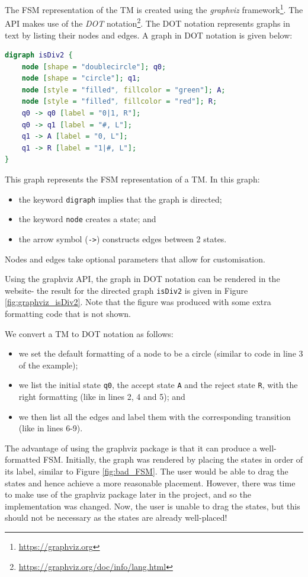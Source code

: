 The FSM representation of the TM is created using the \emph{graphviz} framework\footnote{\url{https://graphviz.org}}. The API makes use of the \emph{DOT} notation\footnote{\url{https://graphviz.org/doc/info/lang.html}}. The DOT notation represents graphs in text by listing their nodes and edges. A graph in DOT notation is given below:
\begin{lstlisting}[language=DOT]
digraph isDiv2 {
    node [shape = "doublecircle"]; q0;
    node [shape = "circle"]; q1;
    node [style = "filled", fillcolor = "green"]; A;
    node [style = "filled", fillcolor = "red"]; R;
    q0 -> q0 [label = "0|1, R"];
    q0 -> q1 [label = "#, L"];
    q1 -> A [label = "0, L"];
    q1 -> R [label = "1|#, L"];
}
\end{lstlisting}
This graph represents the FSM representation of a TM. In this graph:
\begin{itemize}
    \item the keyword \texttt{digraph} implies that the graph is directed;
    \item the keyword \texttt{node} creates a state; and
    \item the arrow symbol (\texttt{->}) constructs edges between 2 states.
\end{itemize}
Nodes and edges take optional parameters that allow for customisation.

Using the graphviz API, the graph in DOT notation can be rendered in the website- the result for the directed graph \texttt{isDiv2} is given in Figure \ref{fig:graphviz_isDiv2}. Note that the figure was produced with some extra formatting code that is not shown.

We convert a TM to DOT notation as follows:
\begin{itemize}
    \item we set the default formatting of a node to be a circle (similar to code in line 3 of the example);
    \item we list the initial state \texttt{q0}, the accept state \texttt{A} and the reject state \texttt{R}, with the right formatting (like in lines 2, 4 and 5); and 
    \item we then list all the edges and label them with the corresponding transition (like in lines 6-9).
\end{itemize}

The advantage of using the graphviz package is that it can produce a well-formatted FSM. Initially, the graph was rendered by placing the states in order of its label, similar to Figure \ref{fig:bad_FSM}. The user would be able to drag the states and hence achieve a more reasonable placement. However, there was time to make use of the graphviz package later in the project, and so the implementation was changed. Now, the user is unable to drag the states, but this should not be necessary as the states are already well-placed!

